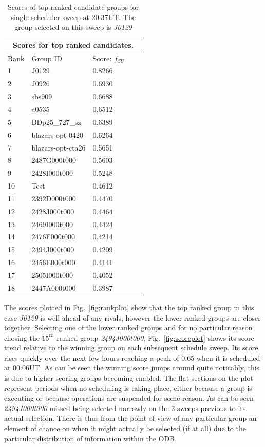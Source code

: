 {{\begin{table}[htbp]
\begin{center}
\begin{tabular}{lllll}
\toprule
\multicolumn{5}{c}{Scores for top ranked candidates.} \\
\midrule
Rank & Group ID & Score: $f_{SU}$ \\
\midrule
1 & J0129 & 0.8266 \\
2 & J0926 & 0.6930 \\
3 & sbs909 & 0.6688 \\
4 & a0535 & 0.6512 \\
5 & BDp25\_727\_sz & 0.6389 \\
6 & blazars-opt-0420 & 0.6264 \\
7 & blazars-opt-cta26 & 0.5651 \\
8 & 2487G000t000 & 0.5603 \\
9 & 2428I000t000 & 0.5248 \\
10 & Test & 0.4612 \\
11 & 2392D000t000 & 0.4470 \\
12 & 2428J000t000 & 0.4464 \\
13 & 2469I000t000 & 0.4424 \\
14 & 2476F000t000 & 0.4214 \\
15 & 2494J000t000 & 0.4209 \\
16 & 2456E000t000 & 0.4141 \\
17 & 2505I000t000 & 0.4052 \\
18 & 2447A000t000 & 0.3987 \\
\bottomrule
\end{tabular}
\end{center}
\caption[Scores of top ranked candidate groups for single scheduler sweep.]
{Scores of top ranked candidate groups for single scheduler sweep at 20:37UT. The group selected on this sweep is \emph{J0129}}
\label{tab:scores}
\end{table}

The scores plotted in Fig.~\ref{fig:rankplot} show that the top ranked group in this case \emph{J0129} is well ahead of any rivals, however the lower ranked groups are closer together. Selecting one of the lower ranked groups and for no particular reason chosing the $15^{th}$ ranked group \emph{2494J000t000}, Fig.~\ref{fig:scoreplot} shows its score trend relative to the winning group on each subsequent schedule sweep. Its score rises quickly over the next few hours reaching a peak of 0.65 when it is scheduled at 00:06UT. As can be seen the winning score jumps around quite noticably, this is due to higher scoring groups becoming enabled. The flat sections on the plot represent periods when no scheduling is taking place, either because a group is executing or because operations are suspended for some reason. As can be seen \emph{2494J000t000} missed being selected narrowly on the 2 sweeps previous to its actual selection. There is thus from the point of view of any particular group an element of chance on when it might actually be selected (if at all) due to the particular distribution of information within the ODB.

}}
